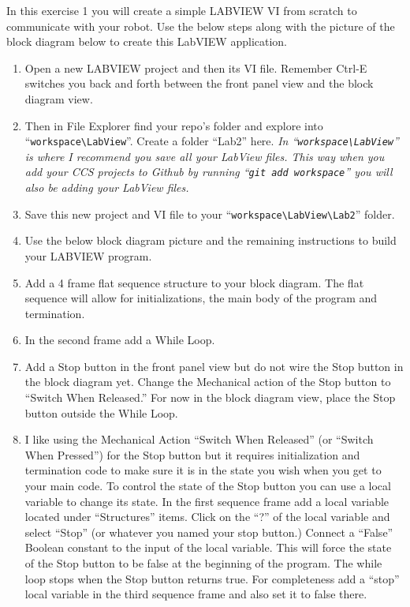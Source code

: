 \documentclass[11pt]{article}
\begin{document}
In this exercise 1 you will create a simple LABVIEW VI from scratch to communicate with your robot. Use the below steps along with the picture of the block diagram below to create this LabVIEW application.
%
\begin{enumerate}
    \item Open a new LABVIEW project and then its VI file. Remember Ctrl-E switches you back and forth between the front panel view and the block diagram view.
    \item Then in File Explorer find your repo’s folder and explore into “\lstinline|workspace\LabView|”. Create a folder “Lab2” here. {\itshape In “\lstinline|workspace\LabView|” is where I recommend you save all your LabView files. This way when you add your CCS projects to Github by running “\lstinline|git add workspace|” you will also be adding your LabView files.}
    \item Save this new project and VI file to your “\lstinline|workspace\LabView\Lab2|” folder.
    \item Use the below block diagram picture and the remaining instructions to build your LABVIEW program.
    \item Add a 4 frame flat sequence structure to your block diagram. The flat sequence will allow for initializations, the main body of the program and termination.
    \item In the second frame add a While Loop.
    \item Add a Stop button in the front panel view but do not wire the Stop button in the block diagram yet. Change the Mechanical action of the Stop button to “Switch When Released.” For now in the block diagram view, place the Stop button outside the While Loop.
    \item I like using the Mechanical Action “Switch When Released” (or “Switch When Pressed”) for the Stop button but it requires initialization and termination code to make sure it is in the state you wish when you get to your main code. To control the state of the Stop button you can use a local variable to change its state. In the first sequence frame add a local variable located under “Structures” items. Click on the “?” of the local variable and select “Stop” (or whatever you named your stop button.) Connect a “False” Boolean constant to the input of the local variable. This will force the state of the Stop button to be false at the beginning of the program. The while loop stops when the Stop button returns true. For completeness add a “stop” local variable in the third sequence frame and also set it to false there.

\end{enumerate}
\end{document}
